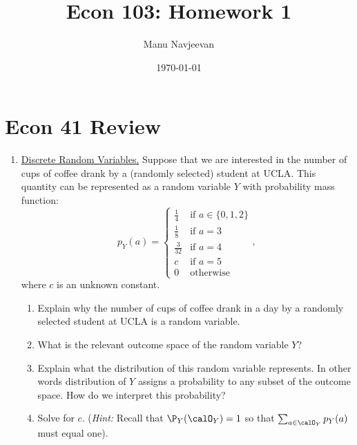 \documentclass[10pt]{article}
\title{Econ 103: Homework 1} %
\author{Manu Navjeevan}
\date{\today}
\begin{document}
\maketitle

\section*{Econ 41 Review}%
\label{sec:econ41review}

\begin{enumerate}
	\item \underline{Discrete Random Variables.} Suppose that we are interested in the number of cups of coffee drank by a (randomly selected) student at UCLA. This quantity can be represented as a random variable \(Y\) with probability mass function:
	 \[
		 p_Y(a) = \begin{cases}
		 	\frac{1}{4}  & \text{if } a\in \{0,1,2\} \\
			\frac{1}{8}  & \text{if } a = 3 \\
			\frac{3}{32}  &\text{if } a = 4 \\
			c &\text{if } a = 5 \\
			0 &\text{otherwise}
		 \end{cases}
	,\]
	where \(c\) is an unknown constant.
	\begin{enumerate}
		\item Explain why the number of cups of coffee drank in a day by a randomly selected student at UCLA is a random variable. 
		
		 
		\item What is the relevant outcome space of the random variable \(Y\)? 

			
		\item Explain what the distribution of this random variable represents. In other words distribution of \(Y\) assigns a probability to any subset of the outcome space. How do we interpret this probability?

		 	
		\item Solve for \(c\). (\emph{Hint:} Recall that \(\P_Y(\calO_Y) = 1\) so that  \(\sum_{a\in\calO_Y} p_Y(a)\) must equal one).
		

\end{enumerate}
\end{enumerate}
\end{document}
